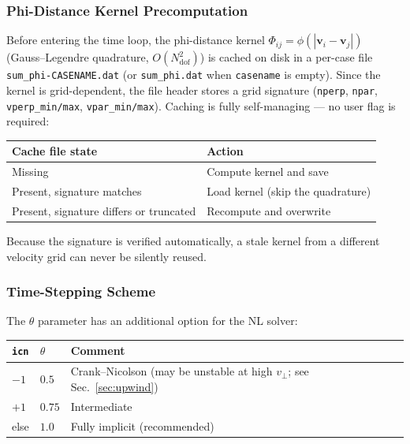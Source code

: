 \documentclass[11pt,a4paper]{article}
\newcommand{\vp}{v_\perp}
\begin{document}
\subsubsection{Phi-Distance Kernel Precomputation}

Before entering the time loop, the phi-distance kernel
$\Phi_{ij} = \phi(|\bm{v}_i - \bm{v}_j|)$ (Gauss--Legendre quadrature,
$O(N_\mathrm{dof}^2)$) is cached on disk in a per-case file
\texttt{sum\_phi-CASENAME.dat} (or \texttt{sum\_phi.dat} when \texttt{casename}
is empty). Since the kernel is grid-dependent, the file header stores a grid
signature (\texttt{nperp}, \texttt{npar}, \texttt{vperp\_min/max},
\texttt{vpar\_min/max}). Caching is fully self-managing --- no user flag is
required:

\begin{center}
\begin{tabular}{ll}
\toprule
Cache file state & Action \\
\midrule
Missing                                  & Compute kernel and save \\
Present, signature matches               & Load kernel (skip the quadrature) \\
Present, signature differs or truncated  & Recompute and overwrite \\
\bottomrule
\end{tabular}
\end{center}

Because the signature is verified automatically, a stale kernel from a
different velocity grid can never be silently reused.

\subsubsection{Time-Stepping Scheme}
\label{sec:nl_theta}

The $\theta$ parameter has an additional option for the NL solver:

\begin{center}
\begin{tabular}{lll}
\toprule
\texttt{icn} & $\theta$ & Comment \\
\midrule
$-1$ & $0.5$ & Crank--Nicolson (may be unstable at high $\vp$; see Sec.~\ref{sec:upwind}) \\
$+1$ & $0.75$ & Intermediate \\
else & $1.0$ & Fully implicit (recommended) \\
\bottomrule
\end{tabular}
\end{center}
\end{document}
